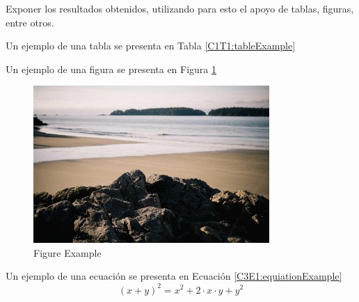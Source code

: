 Exponer los resultados obtenidos, utilizando para esto el apoyo de tablas, figuras, entre otros.

Un ejemplo de una tabla se presenta en Tabla \ref{C1T1:tableExample}



Un ejemplo de una figura se presenta en Figura \ref{C1F1:figureExample}
\begin{figure}[H]
    \centering
    \includegraphics[width=0.8\textwidth]{../02Figures/01Chapter/C1F1_figureExample.png}
    \caption{Figure Example}
    \label{C1F1:figureExample}
\end{figure}

Un ejemplo de una ecuación se presenta en Ecuación \ref{C3E1:equiationExample}
\begin{equation}\label{C3E1:equiationExample}
    (x+y)^2 = x^2 + 2 \cdot x \cdot y + y^2
\end{equation}
    